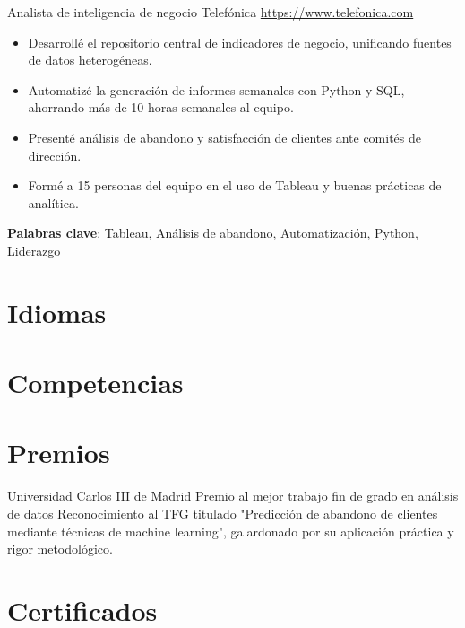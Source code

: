 \documentclass[a4paper, serif, 10pt]{moderncv}
\begin{document}
        {Analista de inteligencia de negocio}
        {Telefónica}
        {\url{https://www.telefonica.com}}
        {}
        {\begin{itemize}
\item Desarrollé el repositorio central de indicadores de negocio, unificando fuentes de datos heterogéneas.
\item Automatizé la generación de informes semanales con Python y SQL, ahorrando más de 10 horas semanales al equipo.
\item Presenté análisis de abandono y satisfacción de clientes ante comités de dirección.
\item Formé a 15 personas del equipo en el uso de Tableau y buenas prácticas de analítica.
\end{itemize}
\textbf{Palabras clave}: Tableau, Análisis de abandono, Automatización, Python, Liderazgo}
\section{Idiomas}

\section{Competencias}

\section{Premios}

        {Universidad Carlos III de Madrid}
        {Premio al mejor trabajo fin de grado en análisis de datos}
        {}
        {}
        {Reconocimiento al TFG titulado "Predicción de abandono de clientes mediante técnicas de machine learning", galardonado por su aplicación práctica y rigor metodológico.}
\section{Certificados}
\end{document}
